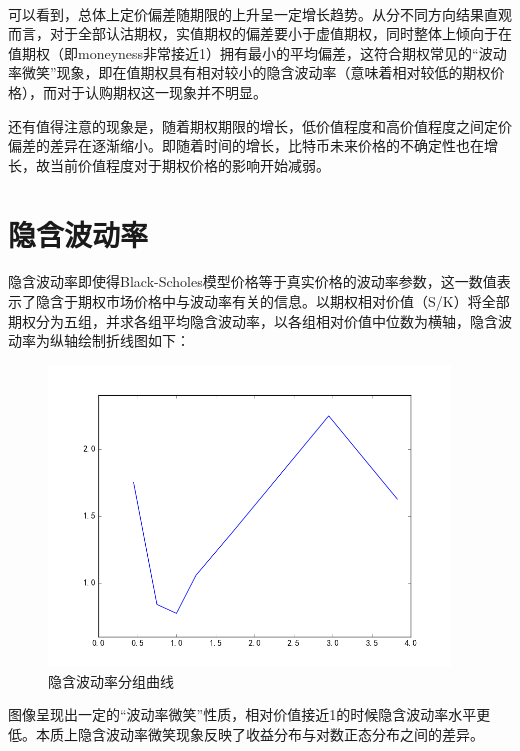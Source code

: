 ~\\
\par{可以看到，总体上定价偏差随期限的上升呈一定增长趋势。从分不同方向结果直观而言，对于全部认沽期权，实值期权的偏差要小于虚值期权，同时整体上倾向于在值期权（即moneyness非常接近1）拥有最小的平均偏差，这符合期权常见的“波动率微笑”现象，即在值期权具有相对较小的隐含波动率（意味着相对较低的期权价格），而对于认购期权这一现象并不明显。}
\par{
    还有值得注意的现象是，随着期权期限的增长，低价值程度和高价值程度之间定价偏差的差异在逐渐缩小。即随着时间的增长，比特币未来价格的不确定性也在增长，故当前价值程度对于期权价格的影响开始减弱。
}
\section{隐含波动率}
隐含波动率即使得Black-Scholes模型价格等于真实价格的波动率参数，这一数值表示了隐含于期权市场价格中与波动率有关的信息。以期权相对价值（S/K）将全部期权分为五组，并求各组平均隐含波动率，以各组相对价值中位数为横轴，隐含波动率为纵轴绘制折线图如下：
\begin{figure}[H]
    \begin{small}
        \begin{center}
            \includegraphics[width=0.95\textwidth]{figures/mean_isd.png}
        \end{center}
        \caption{隐含波动率分组曲线}
        \label{fig:mean_isd}
    \end{small}
\end{figure}
图像呈现出一定的“波动率微笑”性质，相对价值接近1的时候隐含波动率水平更低。本质上隐含波动率微笑现象反映了收益分布与对数正态分布之间的差异。

